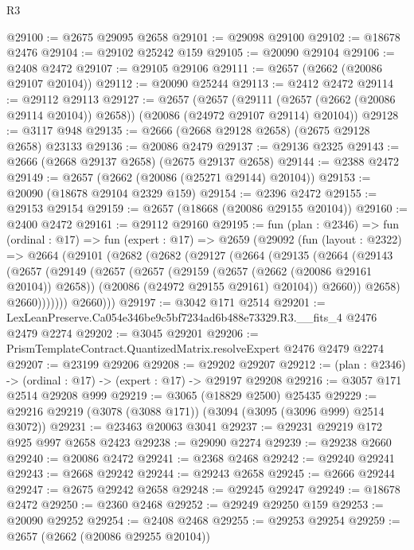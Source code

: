 \begin{lexlean}{R3}
\begin{coremodule}
@29100 := @2675 @29095 @2658
@29101 := @29098 @29100
@29102 := @18678 @2476
@29104 := @29102 @25242 @159
@29105 := @20090 @29104
@29106 := @2408 @2472
@29107 := @29105 @29106
@29111 := @2657 (@2662 (@20086 @29107 @20104))
@29112 := @20090 @25244
@29113 := @2412 @2472
@29114 := @29112 @29113
@29127 := @2657
    (@2657
      (@29111 (@2657 (@2662 (@20086 @29114 @20104)) @2658))
      (@20086 (@24972 @29107 @29114) @20104))
@29128 := @3117 @948
@29135 := @2666 (@2668 @29128 @2658) (@2675 @29128 @2658) @23133
@29136 := @20086 @2479
@29137 := @29136 @2325
@29143 := @2666 (@2668 @29137 @2658) (@2675 @29137 @2658)
@29144 := @2388 @2472
@29149 := @2657 (@2662 (@20086 (@25271 @29144) @20104))
@29153 := @20090 (@18678 @29104 @2329 @159)
@29154 := @2396 @2472
@29155 := @29153 @29154
@29159 := @2657 (@18668 (@20086 @29155 @20104))
@29160 := @2400 @2472
@29161 := @29112 @29160
@29195 := fun (plan : @2346) =>
  fun (ordinal : @17) =>
  fun (expert : @17) =>
  @2659
    (@29092
      (fun (layout : @2322) =>
      @2664
        (@29101
          (@2682
            (@2682
              (@29127
                (@2664
                  (@29135
                    (@2664
                      (@29143
                        (@2657
                          (@29149
                            (@2657
                              (@2657
                                (@29159 (@2657 (@2662 (@20086 @29161 @20104)) @2658))
                                (@20086 (@24972 @29155 @29161) @20104))
                              @2660))
                          @2658)
                        @2660)))))))
          @2660)))
@29197 := @3042 @171 @2514
@29201 := LexLeanPreserve.Ca054e346be9c5bf7234ad6b488e73329.R3.__fits_4 @2476 @2479 @2274
@29202 := @3045 @29201
@29206 := PrismTemplateContract.QuantizedMatrix.resolveExpert @2476 @2479 @2274
@29207 := @23199 @29206
@29208 := @29202 @29207
@29212 := (plan : @2346) -> (ordinal : @17) -> (expert : @17) -> @29197 @29208
@29216 := @3057 @171 @2514 @29208 @999
@29219 := @3065 (@18829 @2500) @25435
@29229 := @29216 @29219 (@3078 (@3088 @171)) (@3094 (@3095 (@3096 @999) @2514 @3072))
@29231 := @23463 @20063 @3041
@29237 := @29231 @29219 @172 @925 @997 @2658 @2423
@29238 := @29090 @2274
@29239 := @29238 @2660
@29240 := @20086 @2472
@29241 := @2368 @2468
@29242 := @29240 @29241
@29243 := @2668 @29242
@29244 := @29243 @2658
@29245 := @2666 @29244
@29247 := @2675 @29242 @2658
@29248 := @29245 @29247
@29249 := @18678 @2472
@29250 := @2360 @2468
@29252 := @29249 @29250 @159
@29253 := @20090 @29252
@29254 := @2408 @2468
@29255 := @29253 @29254
@29259 := @2657 (@2662 (@20086 @29255 @20104))

\end{coremodule}
\end{lexlean}
